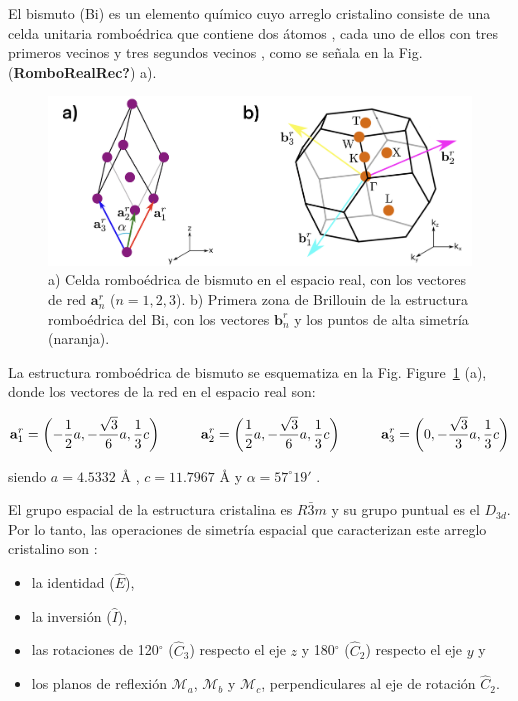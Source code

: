\documentclass[
  letterpaper,
  DIV=11,
  numbers=noendperiod]{scrreprt}
\providecommand{\tightlist}{%
  \setlength{\itemsep}{0pt}\setlength{\parskip}{0pt}}\usepackage{longtable,booktabs,array}
\begin{document}
El bismuto (Bi) es un elemento químico cuyo arreglo cristalino consiste
de una celda unitaria romboédrica que contiene dos átomos
\cite{Falicov1965}, cada uno de ellos con tres primeros vecinos y tres
segundos vecinos \cite{HOFMANN2006}, como se señala en la Fig.
(\textbf{RomboRealRec?}) a).

\begin{figure}

{\centering \includegraphics{./images/RombRealRec.png}

}

\caption{\label{fig-RomboRealRecBi}a) Celda romboédrica de bismuto en el
espacio real, con los vectores de red \(\mathbf{a}^r_n\) (\(n=1,2,3\)).
b) Primera zona de Brillouin de la estructura romboédrica del Bi, con
los vectores \(\mathbf{b}^r_n\) y los puntos de alta simetría
(naranja).}

\end{figure}

La estructura romboédrica de bismuto se esquematiza en la Fig.
Figure~\ref{fig-RomboRealRecBi} (a), donde los vectores de la red en el
espacio real son:

\[
    \mathbf{a}_1^r = \left ( -\frac{1}{2}a , -\frac{\sqrt{3}}{6}a , \frac{1}{3}c \right ) \hspace{10mm}
    \mathbf{a}_2^r = \left (  \frac{1}{2}a , -\frac{\sqrt{3}}{6}a , \frac{1}{3}c \right ) \hspace{10mm}
    \mathbf{a}_3^r = \left (             0 , -\frac{\sqrt{3}}{3}a , \frac{1}{3}c \right ) 
\]

siendo \(a=4.5332\) Å , \(c= 11.7967\) Å y \(\alpha = 57^{\circ}19'\)
\cite{LiuandAllen1995}.

El grupo espacial de la estructura cristalina es \(R\bar{3}m\) y su
grupo puntual es el \(D_{3d}\). Por lo tanto, las operaciones de
simetría espacial que caracterizan este arreglo cristalino son
\cite{Hsu2019}:

\begin{itemize}
\tightlist
\item
  la identidad (\(\hat{E}\)),
\item
  la inversión (\(\hat{I}\)),
\item
  las rotaciones de 120\(^{\circ}\) (\(\hat{C}_3\)) respecto el eje
  \(z\) y 180\(^{\circ}\) (\(\hat{C}_2\)) respecto el eje \(y\) y
\item
  los planos de reflexión \(\mathcal{M}_a\), \(\mathcal{M}_b\) y
  \(\mathcal{M}_c\), perpendiculares al eje de rotación \(\hat{C}_2\).
\end{itemize}
\end{document}
